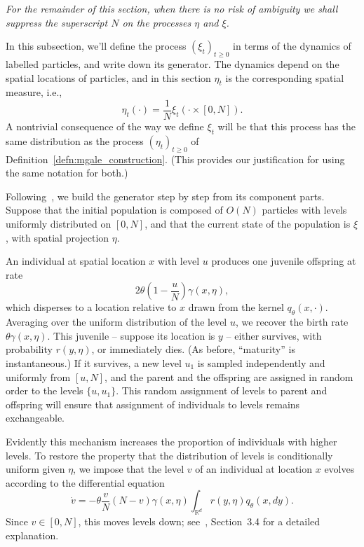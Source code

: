 \documentclass[EJP]{ejpecp} %
\newcommand{\IR}{\mathbb R}
\newcommand{\lp}{\xi}              %
\begin{document}
{\em For the remainder of this section, when there is no risk of ambiguity we shall
suppress the superscript $N$ on the processes $\eta$ and $\xi$.}

In this subsection,
we'll define the process $(\lp_t)_{t \ge 0}$ in terms of the 
dynamics of labelled particles,
and write down its generator.
The dynamics depend on the spatial locations of particles,
and in this section $\eta_t$ is the corresponding spatial measure,
i.e.,
$$
    \eta_t(\cdot) = \frac{1}{N} \lp_t(\cdot \times [0, N])  .
$$
A nontrivial consequence of the way we define $\lp_t$ will be that
this process 
has the same distribution as the process $(\eta_t)_{t \ge 0}$ 
of Definition~\ref{defn:mgale_construction}.
(This provides our justification for using the same notation for both.)


Following~\cite{etheridge/kurtz:2019}, we build the generator step by step
from its 
component parts. 
Suppose that the initial population is composed of $O(N)$ particles
with levels uniformly distributed on $[0, N]$,
and that the current state of the population is $\lp$,
with spatial projection $\eta$.

An individual at spatial location $x$ with level $u$
produces one juvenile offspring at rate 
$$
2 \theta \left(1 - \frac{u}{N}\right) \gamma(x, \eta) ,
$$
which disperses to a location relative to $x$ drawn 
from the kernel $q_{\theta}(x, \cdot)$.
Averaging over the uniform distribution of the level $u$,
we recover the birth rate $\theta\gamma(x, \eta)$.
This juvenile -- suppose its location is $y$ --
either survives, with probability $r(y, \eta)$, or immediately dies.
(As before, ``maturity'' is instantaneous.)
If it survives, 
a new level $u_1$ is sampled independently and uniformly from $[u,N]$,
and the parent and the offspring are assigned in random order to the 
levels $\{u, u_1\}$.
This random assignment of levels to parent
and offspring will ensure that assignment of individuals to levels remains exchangeable.

Evidently this mechanism increases the proportion
of individuals with higher levels.
To restore the property that
the distribution of levels is conditionally uniform
given $\eta$,
we impose that 
the level $v$ of an individual at location $x$
evolves according to the differential equation
$$
    \dot{v}
    =
    -\theta \frac{v}{N} \left(N - v\right)
    \gamma(x, \eta) \int_{\IR^d} r(y, \eta) q_\theta(x, dy) .
$$
Since $v \in [0, N]$, this moves levels down;
see~\cite{etheridge/kurtz:2019}, Section~3.4 for a detailed explanation.
\end{document}
